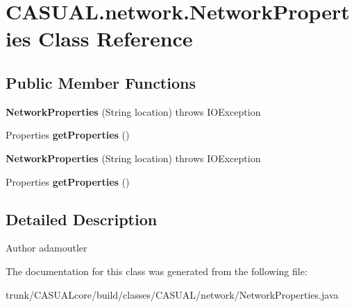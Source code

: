 \hypertarget{class_c_a_s_u_a_l_1_1network_1_1_network_properties}{\section{C\-A\-S\-U\-A\-L.\-network.\-Network\-Properties Class Reference}
\label{class_c_a_s_u_a_l_1_1network_1_1_network_properties}
}
\subsection*{Public Member Functions}
\begin{DoxyCompactItemize}
\item 
\hypertarget{class_c_a_s_u_a_l_1_1network_1_1_network_properties_a67f2156e1572467ccc92bbeb4dbeecac}{{\bfseries Network\-Properties} (String location)  throws I\-O\-Exception }\label{class_c_a_s_u_a_l_1_1network_1_1_network_properties_a67f2156e1572467ccc92bbeb4dbeecac}

\item 
\hypertarget{class_c_a_s_u_a_l_1_1network_1_1_network_properties_a9ff461fdc902c7368990fd828fde2592}{Properties {\bfseries get\-Properties} ()}\label{class_c_a_s_u_a_l_1_1network_1_1_network_properties_a9ff461fdc902c7368990fd828fde2592}

\item 
\hypertarget{class_c_a_s_u_a_l_1_1network_1_1_network_properties_a67f2156e1572467ccc92bbeb4dbeecac}{{\bfseries Network\-Properties} (String location)  throws I\-O\-Exception }\label{class_c_a_s_u_a_l_1_1network_1_1_network_properties_a67f2156e1572467ccc92bbeb4dbeecac}

\item 
\hypertarget{class_c_a_s_u_a_l_1_1network_1_1_network_properties_a9ff461fdc902c7368990fd828fde2592}{Properties {\bfseries get\-Properties} ()}\label{class_c_a_s_u_a_l_1_1network_1_1_network_properties_a9ff461fdc902c7368990fd828fde2592}

\end{DoxyCompactItemize}


\subsection{Detailed Description}
\begin{DoxyAuthor}{Author}
adamoutler 
\end{DoxyAuthor}


The documentation for this class was generated from the following file\-:\begin{DoxyCompactItemize}
\item 
trunk/\-C\-A\-S\-U\-A\-Lcore/build/classes/\-C\-A\-S\-U\-A\-L/network/Network\-Properties.\-java\end{DoxyCompactItemize}
